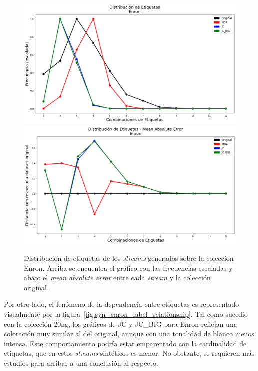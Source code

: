 \begin{figure}[htbp]
	\includegraphics[width=\linewidth]{figures/experiments/syn/enron/label_distribution.png}
	\includegraphics[width=\linewidth]{figures/experiments/syn/enron/ld_mae.png}
	\caption[Distribución de etiquetas de los \textit{streams} generados sobre la colección
		Enron.]{Distribución de etiquetas de los \textit{streams} generados sobre la colección
		Enron. Arriba se encuentra el gráfico con las frecuencias escaladas y
		abajo el \textit{mean absolute error} entre cada \textit{stream} y la
		colección original.}
	\label{fig:syn_enron_label_distribution}
\end{figure}

Por otro lado, el fenómeno de la dependencia entre etiquetas es representado
visualmente por la figura~\ref{fig:syn_enron_label_relationship}. Tal como
sucedió con la colección 20ng, los gráficos de JC y JC\_BIG para Enron reflejan
una coloración muy similar al del original, aunque con una tonalidad de blanco
menos intensa. Este comportamiento podría estar emparentado con la cardinalidad
de etiquetas, que en estos \textit{streams} sintéticos es menor. No obstante, se
requieren más estudios para arribar a una conclusión al respecto.

